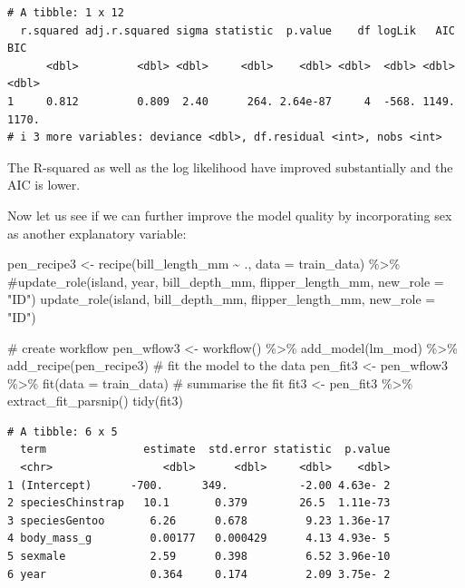 \documentclass[
  letterpaper,
  DIV=11,
  numbers=noendperiod]{scrreprt}
\newenvironment{Shaded}{\begin{snugshade}}{\end{snugshade}}
\newcommand{\AttributeTok}[1]{\textcolor[rgb]{0.40,0.45,0.13}{#1}}
\newcommand{\CommentTok}[1]{\textcolor[rgb]{0.37,0.37,0.37}{#1}}
\newcommand{\FunctionTok}[1]{\textcolor[rgb]{0.28,0.35,0.67}{#1}}
\newcommand{\NormalTok}[1]{\textcolor[rgb]{0.00,0.23,0.31}{#1}}
\newcommand{\OtherTok}[1]{\textcolor[rgb]{0.00,0.23,0.31}{#1}}
\newcommand{\SpecialCharTok}[1]{\textcolor[rgb]{0.37,0.37,0.37}{#1}}
\newcommand{\StringTok}[1]{\textcolor[rgb]{0.13,0.47,0.30}{#1}}
\begin{document}
\begin{verbatim}
# A tibble: 1 x 12
  r.squared adj.r.squared sigma statistic  p.value    df logLik   AIC   BIC
      <dbl>         <dbl> <dbl>     <dbl>    <dbl> <dbl>  <dbl> <dbl> <dbl>
1     0.812         0.809  2.40      264. 2.64e-87     4  -568. 1149. 1170.
# i 3 more variables: deviance <dbl>, df.residual <int>, nobs <int>
\end{verbatim}

The R-squared as well as the log likelihood have improved substantially
and the AIC is lower.

Now let us see if we can further improve the model quality by
incorporating sex as another explanatory variable:

\begin{Shaded}
\begin{Highlighting}[]
\NormalTok{pen\_recipe3 }\OtherTok{\textless{}{-}} 
  \FunctionTok{recipe}\NormalTok{(bill\_length\_mm }\SpecialCharTok{\textasciitilde{}}\NormalTok{ ., }\AttributeTok{data =}\NormalTok{ train\_data) }\SpecialCharTok{\%\textgreater{}\%} 
  \CommentTok{\#update\_role(island, year, bill\_depth\_mm, flipper\_length\_mm, new\_role = "ID")}
  \FunctionTok{update\_role}\NormalTok{(island,  bill\_depth\_mm, flipper\_length\_mm, }\AttributeTok{new\_role =} \StringTok{"ID"}\NormalTok{) }

\CommentTok{\# create workflow}
\NormalTok{pen\_wflow3 }\OtherTok{\textless{}{-}} 
  \FunctionTok{workflow}\NormalTok{() }\SpecialCharTok{\%\textgreater{}\%} 
  \FunctionTok{add\_model}\NormalTok{(lm\_mod) }\SpecialCharTok{\%\textgreater{}\%} 
  \FunctionTok{add\_recipe}\NormalTok{(pen\_recipe3)}
\CommentTok{\# fit the model to the data}
\NormalTok{pen\_fit3 }\OtherTok{\textless{}{-}} 
\NormalTok{  pen\_wflow3 }\SpecialCharTok{\%\textgreater{}\%} 
  \FunctionTok{fit}\NormalTok{(}\AttributeTok{data =}\NormalTok{ train\_data)}
\CommentTok{\# summarise the fit}
\NormalTok{fit3 }\OtherTok{\textless{}{-}}\NormalTok{ pen\_fit3 }\SpecialCharTok{\%\textgreater{}\%} 
  \FunctionTok{extract\_fit\_parsnip}\NormalTok{() }
\FunctionTok{tidy}\NormalTok{(fit3)}
\end{Highlighting}
\end{Shaded}

\begin{verbatim}
# A tibble: 6 x 5
  term               estimate  std.error statistic  p.value
  <chr>                 <dbl>      <dbl>     <dbl>    <dbl>
1 (Intercept)      -700.      349.           -2.00 4.63e- 2
2 speciesChinstrap   10.1       0.379        26.5  1.11e-73
3 speciesGentoo       6.26      0.678         9.23 1.36e-17
4 body_mass_g         0.00177   0.000429      4.13 4.93e- 5
5 sexmale             2.59      0.398         6.52 3.96e-10
6 year                0.364     0.174         2.09 3.75e- 2
\end{verbatim}
\end{document}
